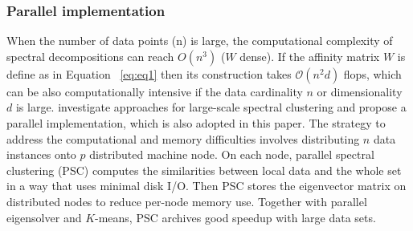 \documentclass[12pt,letterpaper]{article}
\begin{document}

\subsubsection{Parallel implementation}
When the number of data points (n) is large, the computational complexity of spectral decompositions can reach $O(n^3)$ ($W$ dense). If the affinity matrix $W$ is define as in Equation ~\ref{eq:eq1} then its construction takes $\mathcal{O}(n^2d)$ flops, which 
can be also computationally intensive if the data cardinality $n$ or dimensionality $d$ is large.
\cite{Chen2011} investigate approaches for large-scale spectral clustering and propose a parallel implementation, which is also
adopted in this paper. The strategy to address the computational and memory difficulties involves distributing $n$ data instances 
onto $p$ distributed machine node. On each node, parallel spectral clustering (PSC) computes the similarities between local data and the whole set in a way that uses minimal disk I/O. Then PSC stores the eigenvector matrix on distributed nodes to reduce 
per-node memory use. Together with parallel eigensolver and $K$-means, PSC archives good speedup with large data sets.
\end{document}
